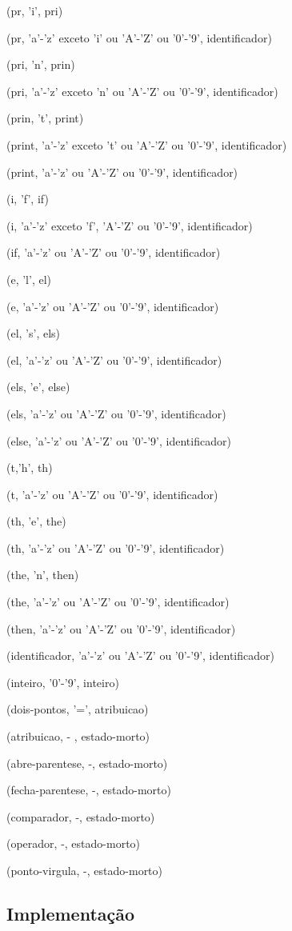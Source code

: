 \documentclass[12pt,a4paper,twoside]{report}
\begin{document}
(pr, 'i', pri)

(pr, 'a'-'z' exceto 'i' ou 'A'-'Z' ou '0'-'9', identificador)

(pri, 'n', prin)

(pri, 'a'-'z' exceto 'n' ou 'A'-'Z' ou '0'-'9', identificador)

(prin, 't', print)

(print, 'a'-'z' exceto 't' ou 'A'-'Z' ou '0'-'9', identificador)

(print, 'a'-'z' ou 'A'-'Z' ou '0'-'9', identificador)

(i, 'f', if)

(i, 'a'-'z' exceto 'f', 'A'-'Z' ou '0'-'9', identificador)

(if, 'a'-'z' ou 'A'-'Z' ou '0'-'9', identificador)

(e, 'l', el)

(e, 'a'-'z' ou 'A'-'Z' ou '0'-'9', identificador)

(el, 's', els)

(el, 'a'-'z' ou 'A'-'Z' ou '0'-'9', identificador)

(els, 'e', else)

(els, 'a'-'z' ou 'A'-'Z' ou '0'-'9', identificador)

(else, 'a'-'z' ou 'A'-'Z' ou '0'-'9', identificador)

(t,'h', th)

(t, 'a'-'z' ou 'A'-'Z' ou '0'-'9', identificador)

(th, 'e', the)

(th, 'a'-'z' ou 'A'-'Z' ou '0'-'9', identificador)

(the, 'n', then)

(the, 'a'-'z' ou 'A'-'Z' ou '0'-'9', identificador)

(then, 'a'-'z' ou 'A'-'Z' ou '0'-'9', identificador)

(identificador, 'a'-'z' ou 'A'-'Z' ou '0'-'9', identificador)

(inteiro, '0'-'9', inteiro)

(dois-pontos, '=', atribuicao)

(atribuicao, - , estado-morto)

(abre-parentese, -, estado-morto)

(fecha-parentese, -, estado-morto)

(comparador, -, estado-morto)

(operador, -, estado-morto)

(ponto-virgula, -, estado-morto)

\subsection{Implementação}
\end{document}
